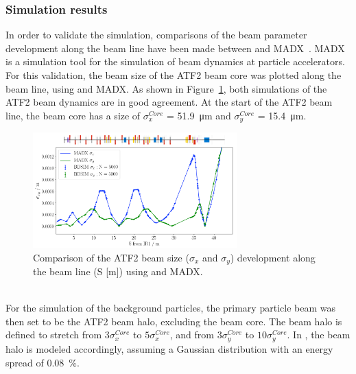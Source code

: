 \subsubsection{Simulation results}
In order to validate the \bdsim simulation, comparisons of the beam parameter development along the beam line have been made between \bdsim and MADX~\cite{MADX}.
MADX is a simulation tool for the simulation of beam dynamics at particle accelerators.
For this validation, the beam size of the ATF2 beam core was plotted along the beam line, using \bdsim and MADX.
As shown in Figure~\ref{fig:MADX}, both simulations of the ATF2 beam dynamics are in good agreement.
At the start of the ATF2 beam line, the beam core has a size of $\sigma^{Core}_x$ = \SI{51.9}{\micro\meter} and $\sigma^{Core}_y$ = \SI{15.4}{\micro\meter}.
\begin{figure}[!h]
\centering
\includegraphics[width=0.7\textwidth]{Figures/ATF/pybdsim_sigma_gmadNuria.png}
\caption[Comparison of the ATF2 beam size development in \bdsim and MADX]{Comparison of the ATF2 beam size ($\sigma_x$ and $\sigma_y$) development along the beam line (S [m]) using \bdsim and MADX.}
\label{fig:MADX}
\end{figure}
\\For the \bdsim simulation of the background particles, the primary particle beam was then set to be the ATF2 beam halo, excluding the beam core.
The beam halo is defined to stretch from $3\sigma^{Core}_x$ to $5\sigma^{Core}_x$, and from $3\sigma^{Core}_y$ to $10\sigma^{Core}_y$.
In \bdsim, the beam halo is modeled accordingly, assuming a Gaussian distribution with an energy spread of \SI{0.08}{\percent}.

